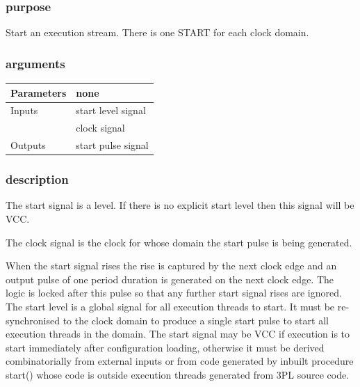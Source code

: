 \documentclass[10pt,a4paper,twoside,fleqn]{book}
\begin{document}
                \subsubsection{purpose}

                    Start an execution stream. There is one START for each
                    clock domain.

                \subsubsection{arguments}

                    \begin{tabular}{| l | l |}
                    \hline
                    Parameters  & none \\
                    \hline
                    Inputs      & start level signal \\
                                & clock signal \\
                    \hline
                    Outputs     & start pulse signal \\
                    \hline
                    \end{tabular}

                \subsubsection{description}

                    The start signal is a level. If there is
                    no explicit start level then this signal will be VCC.
                    
                    The clock signal is the clock for whose domain the start pulse
                    is being generated.
                    
                    When the start signal rises the rise is captured by the next
                    clock edge and an output pulse of one period duration is
                    generated on the next clock edge. The logic is locked after this
                    pulse so that any further start signal rises are ignored. The
                    start level is a global signal for all execution threads to
                    start. It must be re-synchronised to the clock domain to produce
                    a single start pulse to start all execution threads in the
                    domain. The start signal may be VCC if execution is to start
                    immediately after configuration loading, otherwise it must be
                    derived combinatorially from external inputs or from code
                    generated by inbuilt procedure start() whose code is outside
                    execution threads generated from 3PL source code.
\end{document}
